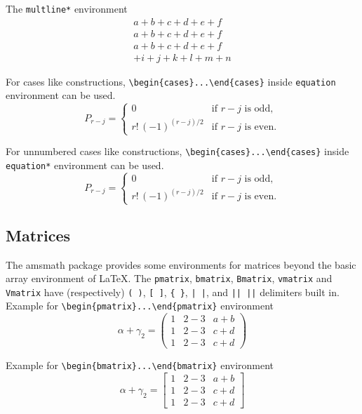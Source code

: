 \documentclass[numbers,webpdf,imaiai]{ima-authoring-template}%
\theoremstyle{thmstyleone}%
\theoremstyle{thmstyletwo}%
\theoremstyle{thmstylethree}%
\numberwithin{equation}{section}
\begin{document}
The \verb+multline*+ environment
\begin{multline*}
a+b+c+d+e+f \\
a+b+c+d+e+f \\
a+b+c+d+e+f \\
+i+j+k+l+m+n
\end{multline*}

For cases like constructions, \verb+\begin{cases}...\end{cases}+ inside \verb+equation+ environment can be used.
\begin{equation}
P_{r-j}=\begin{cases}
0& \text{if $r-j$ is odd},\\
r!\,(-1)^{(r-j)/2}& \text{if $r-j$ is even}.
\end{cases}
\end{equation}

For unnumbered cases like constructions, \verb+\begin{cases}...\end{cases}+ inside \verb+equation*+ environment can be used.
\begin{equation*}
P_{r-j}=\begin{cases}
0& \text{if $r-j$ is odd},\\
r!\,(-1)^{(r-j)/2}& \text{if $r-j$ is even}.
\end{cases}
\end{equation*}

\subsection{Matrices}

The amsmath package provides some environments for matrices beyond the basic array environment of LaTeX.
The \verb+pmatrix+, \verb+bmatrix+, \verb+Bmatrix+, \verb+vmatrix+ and \verb+Vmatrix+ have (respectively)
\verb+( )+, \verb+[ ]+, \verb+{ }+, \verb+| |+, and \verb+|| ||+ delimiters built in. Example for
\verb+\begin{pmatrix}...\end{pmatrix}+ environment
\begin{equation*}
\alpha + \gamma_{2} = \begin{pmatrix}
1 &2-3 &a+b\\
1 &2-3 &c+d\\
1 &2-3 &c+d
\end{pmatrix}
\end{equation*}

Example for \verb+\begin{bmatrix}...\end{bmatrix}+ environment
\begin{equation}
\alpha + \gamma_{2} = \begin{bmatrix}
1 &2-3 &a+b\\
1 &2-3 &c+d\\
1 &2-3 &c+d
\end{bmatrix}
\end{equation}
\end{document}
